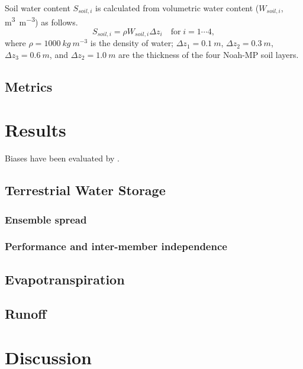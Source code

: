 \documentclass[essd]{copernicus}
\begin{document}
Soil water content $S_{soil,i}$ is calculated from volumetric water content ($W_{soil,i}$, \unit{m^3 m^{-3}}) as follows.
\begin{equation}
    S_{soil,i} = \rho W_{soil,i} \Delta z_i \quad \mathrm{for} \; i = 1 \cdots 4 ,
\end{equation}
where $\rho=1000~\unit{kg~m^{-3}}$ is the density of water; $\Delta z_1=0.1~\unit{m}$, $\Delta z_2=0.3~\unit{m}$, $\Delta z_3=0.6~\unit{m}$, and $\Delta z_2=1.0~\unit{m}$ are the thickness of the four Noah-MP soil layers.


\subsection{Metrics}


\section{Results}


Biases have been evaluated by \citet{zheng2020JAMES}.


\subsection{Terrestrial Water Storage}

\subsubsection{Ensemble spread}

\subsubsection{Performance and inter-member independence}

\subsection{Evapotranspiration}


\subsection{Runoff}


\section{Discussion}


\end{document}
